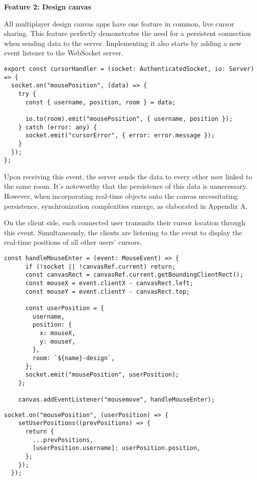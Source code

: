 \textbf{Feature 2: Design canvas}

All multiplayer design canvas apps have one feature in common, live cursor sharing. This feature perfectly demonstrates the need for a persistent connection when sending data to the server. Implementing it also starts by adding a new event listener to the WebSocket server.

\begin{lstlisting}[caption=Cursor Event Handler]
export const cursorHandler = (socket: AuthenticatedSocket, io: Server) => {
  socket.on("mousePosition", (data) => {
    try {
      const { username, position, room } = data;

      io.to(room).emit("mousePosition", { username, position });
    } catch (error: any) {
      socket.emit("cursorError", { error: error.message });
    }
  });
};
\end{lstlisting}

Upon receiving this event, the server sends the data to every other user linked to the same room. It's noteworthy that the persistence of this data is unnecessary. However, when incorporating real-time objects onto the canvas necessitating persistence, synchronization complexities emerge, as elaborated in Appendix A.

On the client side, each connected user transmits their cursor location through this event. Simultaneously, the clients are listening to the event to display the real-time positions of all other users' cursors.

\begin{lstlisting}[caption=Client sending cursor data to server]
    const handleMouseEnter = (event: MouseEvent) => {
      if (!socket || !canvasRef.current) return;
      const canvasRect = canvasRef.current.getBoundingClientRect();
      const mouseX = event.clientX - canvasRect.left;
      const mouseY = event.clientY - canvasRect.top;
    
      const userPosition = {
        username,
        position: {
          x: mouseX,
          y: mouseY,
        },
        room: `${name}-design`,
      };
      socket.emit("mousePosition", userPosition);
    };
    
    canvas.addEventListener("mousemove", handleMouseEnter);
\end{lstlisting}

\begin{lstlisting}[caption=Client receiving other cursor data]
  socket.on("mousePosition", (userPosition) => {
    setUserPositions((prevPositions) => {
      return {
        ...prevPositions,
        [userPosition.username]: userPosition.position,
      };
    });
  });
\end{lstlisting}

